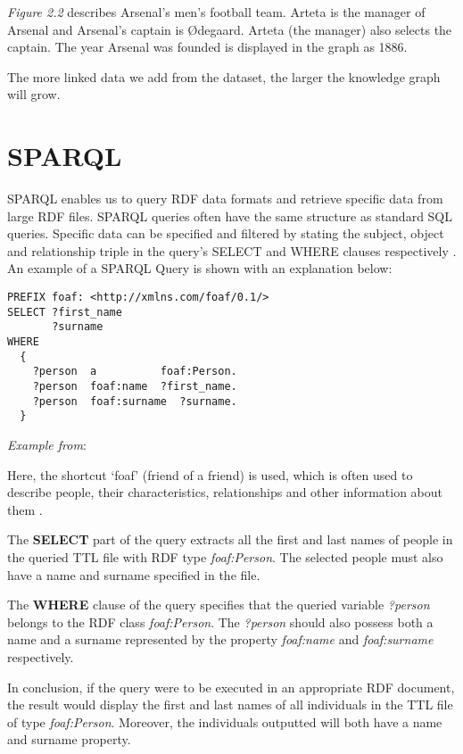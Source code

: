 \textit{Figure 2.2} describes Arsenal's men's football team. Arteta is the manager of Arsenal and Arsenal's captain is Ødegaard. Arteta (the manager) also selects the captain. The year Arsenal was founded is displayed in the graph as 1886.

The more linked data we add from the dataset, the larger the knowledge graph will grow.

\section{SPARQL}
\hspace{0.5cm} SPARQL enables us to query RDF data formats and retrieve specific data from large RDF files. SPARQL queries often have the same structure as standard SQL queries. Specific data can be specified and filtered by stating the subject, object and relationship triple in the query's SELECT and WHERE clauses respectively \cite{sparlbook}. An example of a SPARQL Query is shown with an explanation below:

\begin{lstlisting}
PREFIX foaf: <http://xmlns.com/foaf/0.1/>
SELECT ?first_name 
       ?surname
WHERE
  {
    ?person  a          foaf:Person.
    ?person  foaf:name  ?first_name.
    ?person  foaf:surname  ?surname.
  }
\end{lstlisting}
\textit{Example from}: \cite{foaf}

\medskip
Here, the shortcut `foaf' (friend of a friend) is used, which is often used to describe people, their characteristics, relationships and other information about them \cite{foaf}.

The \textbf{SELECT} part of the query extracts all the first and last names of people in the queried TTL file with RDF type \textit{foaf:Person}. The selected people must also have a name and surname specified in the file.

The \textbf{WHERE} clause of the query specifies that the queried variable \textit{?person} belongs to the RDF class \textit{foaf:Person}. The \textit{?person} should also possess both a name and a surname represented by the property \textit{foaf:name} and \textit{foaf:surname} respectively.

In conclusion, if the query were to be executed in an appropriate RDF document, the result would display the first and last names of all individuals in the TTL file of type \textit{foaf:Person}. Moreover, the individuals outputted will both have a name and surname property.
